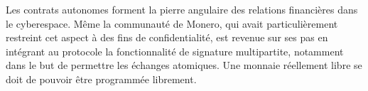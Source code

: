 Les contrats autonomes forment la pierre angulaire des relations financières dans le cyberespace. Même la communauté de Monero, qui avait particulièrement restreint cet aspect à des fins de confidentialité, est revenue sur ses pas en intégrant au protocole la fonctionnalité de signature multipartite, notamment dans le but de permettre les échanges atomiques. Une monnaie réellement libre se doit de pouvoir être programmée librement.
